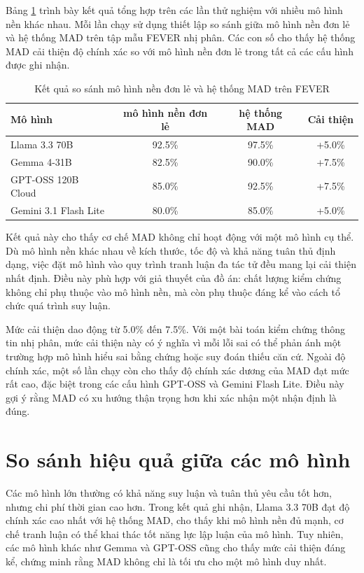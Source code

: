 ﻿\documentclass[oneside,a4paper,12pt]{extreport}
\begin{document}
Bảng \ref{tab:fever_results} trình bày kết quả tổng hợp trên các lần thử nghiệm với nhiều mô hình nền khác nhau. Mỗi lần chạy sử dụng thiết lập so sánh giữa mô hình nền đơn lẻ và hệ thống MAD trên tập mẫu FEVER nhị phân. Các con số cho thấy hệ thống MAD cải thiện độ chính xác so với mô hình nền đơn lẻ trong tất cả các cấu hình được ghi nhận.

\begin{table}[H]
\centering
\caption{Kết quả so sánh mô hình nền đơn lẻ và hệ thống MAD trên FEVER}
\label{tab:fever_results}
\begin{tabular}{|p{5cm}|c|c|c|}
\hline
\textbf{Mô hình} & \textbf{mô hình nền đơn lẻ} & \textbf{hệ thống MAD} & \textbf{Cải thiện} \\
\hline
Llama 3.3 70B & 92.5\% & 97.5\% & +5.0\% \\
\hline
Gemma 4-31B & 82.5\% & 90.0\% & +7.5\% \\
\hline
GPT-OSS 120B Cloud & 85.0\% & 92.5\% & +7.5\% \\
\hline
Gemini 3.1 Flash Lite & 80.0\% & 85.0\% & +5.0\% \\
\hline
\end{tabular}
\end{table}

Kết quả này cho thấy cơ chế MAD không chỉ hoạt động với một mô hình cụ thể. Dù mô hình nền khác nhau về kích thước, tốc độ và khả năng tuân thủ định dạng, việc đặt mô hình vào quy trình tranh luận đa tác tử đều mang lại cải thiện nhất định. Điều này phù hợp với giả thuyết của đồ án: chất lượng kiểm chứng không chỉ phụ thuộc vào mô hình nền, mà còn phụ thuộc đáng kể vào cách tổ chức quá trình suy luận.

Mức cải thiện dao động từ 5.0\% đến 7.5\%. Với một bài toán kiểm chứng thông tin nhị phân, mức cải thiện này có ý nghĩa vì mỗi lỗi sai có thể phản ánh một trường hợp mô hình hiểu sai bằng chứng hoặc suy đoán thiếu căn cứ. Ngoài độ chính xác, một số lần chạy còn cho thấy độ chính xác dương của MAD đạt mức rất cao, đặc biệt trong các cấu hình GPT-OSS và Gemini Flash Lite. Điều này gợi ý rằng MAD có xu hướng thận trọng hơn khi xác nhận một nhận định là đúng.

\section{So sánh hiệu quả giữa các mô hình}

Các mô hình lớn thường có khả năng suy luận và tuân thủ yêu cầu tốt hơn, nhưng chi phí thời gian cao hơn. Trong kết quả ghi nhận, Llama 3.3 70B đạt độ chính xác cao nhất với hệ thống MAD, cho thấy khi mô hình nền đủ mạnh, cơ chế tranh luận có thể khai thác tốt năng lực lập luận của mô hình. Tuy nhiên, các mô hình khác như Gemma và GPT-OSS cũng cho thấy mức cải thiện đáng kể, chứng minh rằng MAD không chỉ là tối ưu cho một mô hình duy nhất.
\end{document}
